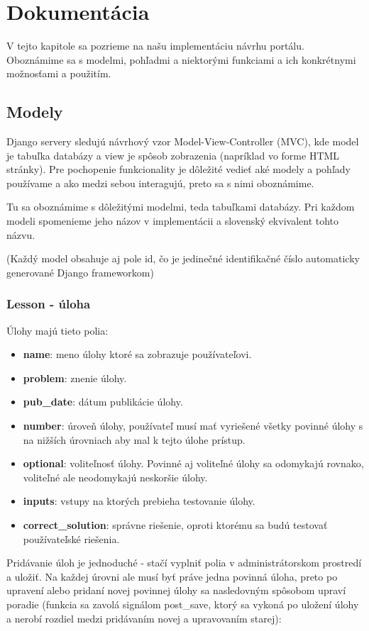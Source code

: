 \chapter{Dokumentácia}
\label{kap:doc}
V tejto kapitole sa pozrieme na našu implementáciu návrhu portálu. Oboznámime sa
s modelmi, pohľadmi a niektorými funkciami a ich konkrétnymi možnosťami a použitím.
\section{Modely}
\label{modely}
Django servery sledujú návrhový vzor Model-View-Controller (MVC), kde model je tabuľka
databázy a view je spôsob zobrazenia (napríklad vo forme HTML stránky). Pre pochopenie
funkcionality je dôležité vedieť aké modely a pohľady používame a ako medzi sebou interagujú,
preto sa s nimi oboznámime.

Tu sa oboznámime s dôležitými modelmi, teda tabuľkami databázy.
Pri každom modeli spomenieme jeho názov v implementácii a slovenský ekvivalent tohto názvu.

(Každý model obsahuje aj pole id, čo je jedinečné identifikačné číslo automaticky generované
Django frameworkom)
\subsection{Lesson - úloha}
\label{doc:lesson}
Úlohy majú tieto polia:
\begin{itemize}
\itemsep0em
\item \textbf{name}: meno úlohy ktoré sa zobrazuje používateľovi.
\item \textbf{problem}: znenie úlohy.
\item \textbf{pub\_date}: dátum publikácie úlohy.
\item \textbf{number}: úroveň úlohy, používateľ musí mať vyriešené všetky povinné úlohy s
  na nižších úrovniach aby mal k tejto úlohe prístup.
\item \textbf{optional}: voliteľnosť úlohy. Povinné aj voliteľné úlohy sa odomykajú rovnako, voliteľné
   ale neodomykajú neskoršie úlohy.
\item \textbf{inputs}: vstupy na ktorých prebieha testovanie úlohy.
\item \textbf{correct\_solution}: správne riešenie, oproti ktorému sa budú testovať používateľské
   riešenia.
\end{itemize}

Pridávanie úloh je jednoduché - stačí vyplniť polia v administrátorskom prostredí
a uložiť. Na každej úrovni ale musí byť práve jedna povinná úloha, preto po upravení
alebo pridaní novej povinnej úlohy sa nasledovným spôsobom upraví poradie
(funkcia sa zavolá signálom post\_save, ktorý sa vykoná po uložení úlohy a nerobí
rozdiel medzi pridávaním novej a upravovaním starej):

